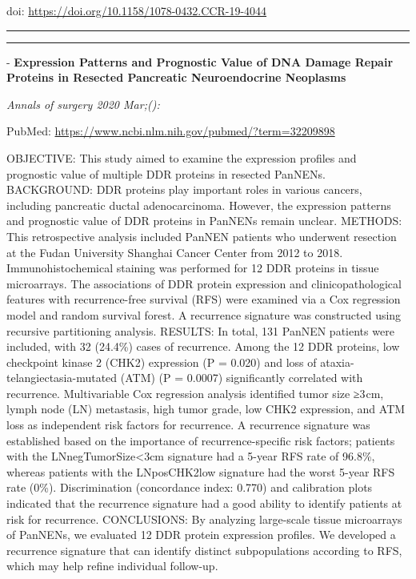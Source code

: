 \documentclass[
]{article}
\begin{document}
doi: \url{https://doi.org/10.1158/1078-0432.CCR-19-4044}

\begin{center}\rule{0.5\linewidth}{0.5pt}\end{center}

\begin{center}\rule{0.5\linewidth}{0.5pt}\end{center}

- \textbf{Expression Patterns and Prognostic Value of DNA Damage Repair
Proteins in Resected Pancreatic Neuroendocrine Neoplasms}

\emph{Annals of surgery 2020 Mar;():}

PubMed: \url{https://www.ncbi.nlm.nih.gov/pubmed/?term=32209898}

OBJECTIVE: This study aimed to examine the expression profiles and
prognostic value of multiple DDR proteins in resected PanNENs.
BACKGROUND: DDR proteins play important roles in various cancers,
including pancreatic ductal adenocarcinoma. However, the expression
patterns and prognostic value of DDR proteins in PanNENs remain unclear.
METHODS: This retrospective analysis included PanNEN patients who
underwent resection at the Fudan University Shanghai Cancer Center from
2012 to 2018. Immunohistochemical staining was performed for 12 DDR
proteins in tissue microarrays. The associations of DDR protein
expression and clinicopathological features with recurrence-free
survival (RFS) were examined via a Cox regression model and random
survival forest. A recurrence signature was constructed using recursive
partitioning analysis. RESULTS: In total, 131 PanNEN patients were
included, with 32 (24.4\%) cases of recurrence. Among the 12 DDR
proteins, low checkpoint kinase 2 (CHK2) expression (P = 0.020) and loss
of ataxia-telangiectasia-mutated (ATM) (P = 0.0007) significantly
correlated with recurrence. Multivariable Cox regression analysis
identified tumor size ≥3 cm, lymph node (LN) metastasis, high tumor
grade, low CHK2 expression, and ATM loss as independent risk factors for
recurrence. A recurrence signature was established based on the
importance of recurrence-specific risk factors; patients with the
LNnegTumorSize\textless3cm signature had a 5-year RFS rate of 96.8\%,
whereas patients with the LNposCHK2low signature had the worst 5-year
RFS rate (0\%). Discrimination (concordance index: 0.770) and
calibration plots indicated that the recurrence signature had a good
ability to identify patients at risk for recurrence. CONCLUSIONS: By
analyzing large-scale tissue microarrays of PanNENs, we evaluated 12 DDR
protein expression profiles. We developed a recurrence signature that
can identify distinct subpopulations according to RFS, which may help
refine individual follow-up.
\end{document}
